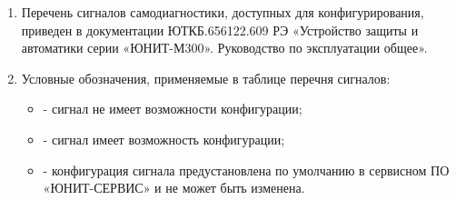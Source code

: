 \areaset{267mm}{180mm}
\fancyheadoffset{0pt} %


\begin{landscape}

\setlength{\footskip}{15.5pt}

\color{black}

\begin{enumerate}[label=\ref{app:signals}.\arabic*] %
  \item Перечень сигналов самодиагностики, доступных для конфигурирования, приведен в документации ЮТКБ.656122.609 РЭ «Устройство защиты и автоматики серии «ЮНИТ-М300». Руководство по эксплуатации общее».
  \item Условные обозначения, применяемые в таблице перечня сигналов:
  \begin{itemize}
    \item[$\text{(--)}$] { - сигнал не имеет возможности конфигурации;}
    \item[$\text{(+)}$] { - сигнал имеет возможность конфигурации;}
    \item[$\text{(*)}$] { - конфигурация сигнала предустановлена по умолчанию в сервисном ПО «ЮНИТ-СЕРВИС» и не может быть изменена.}
  \end{itemize}
\end{enumerate}

\small %
\begin{longtable}{
>{\centering\arraybackslash}m{6.0cm}
|>{\centering\arraybackslash}m{3.45cm}
|>{\centering\arraybackslash}m{2cm}
|>{\centering\arraybackslash}m{2cm}
|>{\centering\arraybackslash}m{2cm}
|>{\centering\arraybackslash}m{2cm}
|>{\centering\arraybackslash}m{2cm}
|>{\centering\arraybackslash}m{2cm}
|>{\centering\arraybackslash}m{2.107cm}
}


\end{longtable}
\end{landscape}
